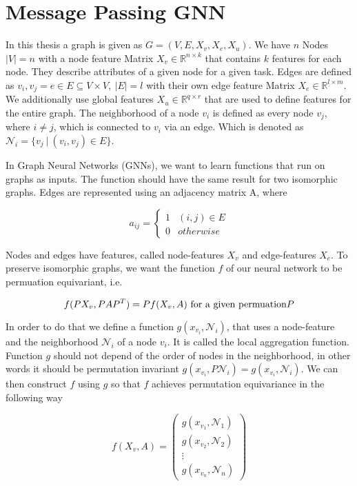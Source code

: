 \section{Message Passing GNN}
In this thesis a graph is given as $G=(V,E,X_v,X_e, X_u)$. We have $n$ Nodes $|V|=n$ with a node feature Matrix  $X_v \in \mathbb{R}^{n \times k}$ that contains $k$ features for each node. They describe attributes of a given node for a given task. Edges are defined as ${v_i,v_j} = e \in E \subseteq V \times V,\ |E| = l$ with their own edge feature Matrix $X_e \in \mathbb{R}^{l \times m}$. We additionally use global features $X_u \in \mathbb{R}^{q \times r}$ that are used to define features for the entire graph. The neighborhood of a node $v_i$ is defined as every node $v_j$, where $i \neq j$, which is connected to $v_i$ via an edge. Which is denoted as $\mathcal{N}_i = \{v_j\ |\ (v_i, v_j) \in E\}$. \par

In Graph Neural Networks (GNNs), we want to learn functions that run on graphs as inputs. The function should have the same result for two isomorphic graphs. Edges are represented using an adjacency matrix A, where

\begin{equation}
    a_{ij} = \begin{cases} 1& (i,j) \in E \\ 0 & otherwise \end{cases} \nonumber
\end{equation}

Nodes and edges have features, called node-features $X_v$ and edge-features $X_e$. To preserve isomorphic graphs, we want the function $f$ of our neural network to be permuation equivariant, i.e. 

\begin{equation}
    f(PX_v,PAP^T) = Pf(X_v,A)\ \textup{for a given permuation} P \nonumber
\end{equation}

In order to do that we define a function $g(x_{v_i}, \mathcal{N}_i)$, that uses a node-feature and the neighborhood  $\mathcal{N}_i$ of a node $v_i$. It is called the local aggregation function. Function $g$ should not depend of the order of nodes in the neighborhood, in other words it should be permutation invariant $g(x_{v_i}, P\mathcal{N}_i) = g(x_{v_i}, \mathcal{N}_i)$. We can then construct $f$ using $g$ so that $f$ achieves permutation equivariance in the following way

\begin{equation}
    f(X_v,A) = \begin{pmatrix} g(x_{v_1},\mathcal{N}_1) \\ g(x_{v_2},\mathcal{N}_2) \\ \vdots \\ g(x_{v_n},\mathcal{N}_n) \end{pmatrix} \nonumber
\end{equation}

